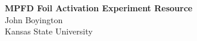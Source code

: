 \documentclass[a4paper, 11pt]{article}
\begin{document}
\thispagestyle{empty}
\noindent
\large\textbf{MPFD Foil Activation Experiment Resource} \\
\hfill John Boyington \\
\hfill Kansas State University \\

\vspace{0.005\textheight}




\end{document}
